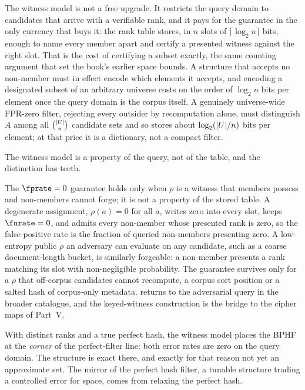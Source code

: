 The witness model is not a free upgrade. It restricts the query domain
to candidates that arrive with a verifiable rank, and it pays for the
guarantee in the only currency that buys it: the rank table stores, in
$n$ slots of $\lceil \log_2 n \rceil$ bits, enough to name every member
apart and certify a presented witness against the right slot. That is
the cost of certifying a subset exactly, the same counting argument that
set the book's earlier space bounds. A structure that accepts no
non-member must in effect encode which elements it accepts, and encoding
a designated subset of an arbitrary universe costs on the order of
$\log_2 n$ bits per element once the query domain is the corpus itself.
A genuinely universe-wide FPR-zero filter, rejecting every outsider by
recomputation alone, must distinguish $A$ among all $\binom{|U|}{n}$
candidate sets and so stores about $\log_2(|U|/n)$ bits per
element; at that price it is a dictionary, not a compact filter.

The witness model is a property of the query, not of the table, and the
distinction has teeth.

\begin{remark}
\label{rem:witness-is-query-model}
The $\fprate = 0$ guarantee holds only when $\rho$ is a witness that
members possess and non-members cannot forge; it is not a property of the
stored table. A degenerate assignment, $\rho(a) = 0$ for all $a$, writes
zero into every slot, keeps $\fnrate = 0$, and admits every non-member
whose presented rank is zero, so the false-positive rate is the fraction
of queried non-members presenting zero. A low-entropy public $\rho$ an
adversary can evaluate on any candidate, such as a coarse document-length
bucket, is similarly forgeable: a non-member presents a rank matching its
slot with non-negligible probability. The guarantee survives only for a
$\rho$ that off-corpus candidates cannot recompute, a corpus sort
position or a salted hash of corpus-only metadata. 
returns to the adversarial query in the broader catalogue, and the
keyed-witness construction is the bridge to the cipher maps of Part~V.
\end{remark}

With distinct ranks and a true perfect hash, the witness model places the
BPHF at the \emph{corner} of the perfect-filter line: both error rates
are zero on the query domain. The structure is exact there, and exactly
for that reason not yet an approximate set. The mirror of the perfect
hash filter, a tunable structure trading a controlled error for space,
comes from relaxing the perfect hash.

